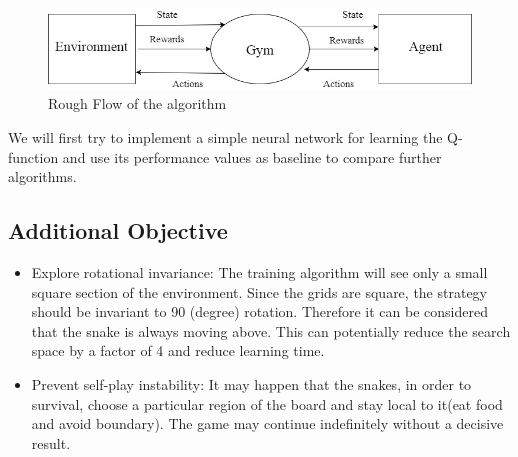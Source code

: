 \documentclass[conference]{IEEEtran}
\begin{document}
\begin{figure}[h]

	\includegraphics[width=\linewidth]{flow.jpg}
	\caption{Rough Flow of the algorithm}

\end{figure}
We will first try to implement a simple neural network for learning the
Q-function and use its performance values as baseline to compare further algorithms.  \newline\par


\subsection{Additional Objective}
\begin{itemize}
	\item{Explore rotational invariance: The training algorithm will see only a
  small square section of the environment. Since the grids are square, the
  strategy should be invariant to 90 (degree) rotation. Therefore it can be
  considered that the snake is always moving above. This can potentially
  reduce the search space by a factor of 4 and reduce learning time.}
	\item{Prevent self-play instability: It may happen that the snakes, in
  order to survival, choose a particular region of the board and stay local
  to it(eat food and avoid boundary). The game may continue indefinitely
  without a decisive result. }
\end{itemize}
\section*{}
\end{document}
